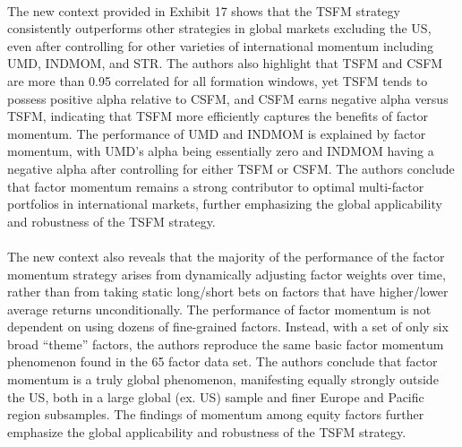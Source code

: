 \documentclass{article}
\begin{document}
\\
The new context provided in Exhibit 17 shows that the TSFM strategy consistently outperforms other strategies in global markets excluding the US, even after controlling for other varieties of international momentum including UMD, INDMOM, and STR. The authors also highlight that TSFM and CSFM are more than 0.95 correlated for all formation windows, yet TSFM tends to possess positive alpha relative to CSFM, and CSFM earns negative alpha versus TSFM, indicating that TSFM more efficiently captures the benefits of factor momentum. The performance of UMD and INDMOM is explained by factor momentum, with UMD’s alpha being essentially zero and INDMOM having a negative alpha after controlling for either TSFM or CSFM. The authors conclude that factor momentum remains a strong contributor to optimal multi-factor portfolios in international markets, further emphasizing the global applicability and robustness of the TSFM strategy. \\
\\
The new context also reveals that the majority of the performance of the factor momentum strategy arises from dynamically adjusting factor weights over time, rather than from taking static long/short bets on factors that have higher/lower average returns unconditionally. The performance of factor momentum is not dependent on using dozens of fine-grained factors. Instead, with a set of only six broad “theme” factors, the authors reproduce the same basic factor momentum phenomenon found in the 65 factor data set. The authors conclude that factor momentum is a truly global phenomenon, manifesting equally strongly outside the US, both in a large global (ex. US) sample and finer Europe and Pacific region subsamples. The findings of momentum among equity factors further emphasize the global applicability and robustness of the TSFM strategy. 
\end{document}
